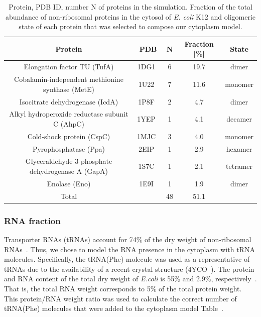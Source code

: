 \documentclass[journal=jpcisd8,manuscript=article]{achemso}
\newcommand{\tabref}[1]{Table~\plainref{#1}}
\begin{document}
\begin{table}[H]
\centering
\caption{Protein, PDB ID, number N of proteins in the simulation. 
Fraction of the total abundance of non-ribosomal proteins in the cytosol of {\em
    E. coli} K12 and oligomeric state of each protein that was
  selected to compose our cytoplasm model.}
\label{tbl:protein_fraction}
\begin{tabular}{ccccc}
\hline
Protein & PDB & N & Fraction [\%] & State\\
\hline
Elongation factor TU (TufA) & 1DG1~\cite{Abel1996}       & 6 & 19.7 &  dimer \\
Cobalamin-independent methionine synthase (MetE) & 1U22~\cite{Ferrer2004}     & 7 & 11.6 &  monomer \\
Isocitrate dehydrogenase (IcdA) & 1P8F~\cite{Mesecar2000}    & 2 & 4.7  &  dimer \\
Alkyl hydroperoxide reductase subunit C (AhpC) & 1YEP~\cite{Parsonage2005}  & 1 & 4.1  &  decamer \\
Cold-shock protein (CspC) & 1MJC~\cite{Schindelin1994} & 3 & 4.0  &  monomer \\
Pyrophosphatase (Ppa)  & 2EIP~\cite{Kankare1996}    & 1 & 2.9  &  hexamer \\
Glyceraldehyde 3-phosphate dehydrogenase A (GapA) & 1S7C~\cite{ShinXXX}        & 1 & 2.1  &  tetramer \\
Enolase (Eno)  & 1E9I~\cite{Kuhnel2001}     & 1 & 1.9  &  dimer \\
\hline
Total &                           & 48& 51.1 & \\
\hline
\end{tabular}
\end{table}


\subsubsection{RNA fraction}
Transporter RNAs (tRNAs) account for 74\% of the dry weight of
non-ribosomal RNAs~\cite{phillips2012}. Thus, we chose to model the
RNA presence in the cytoplasm with tRNA molecules. Specifically, 
 the tRNA(Phe) molecule was used as a representative of tRNAs due to
the availability of a recent crystal
structure (4YCO~\cite{Byrne2015}). The protein and RNA content of the total
dry weight of \textit{E.coli} is 55\% and 2.9\%,
respectively~\cite{phillips2012}. That is, the total RNA weight
corresponds to 5\% of the total protein weight. This protein/RNA
weight ratio was used to calculate the correct number of tRNA(Phe)
molecules that were added to the cytoplasm model
\tabref{tbl:soup_components}.
\end{document}
